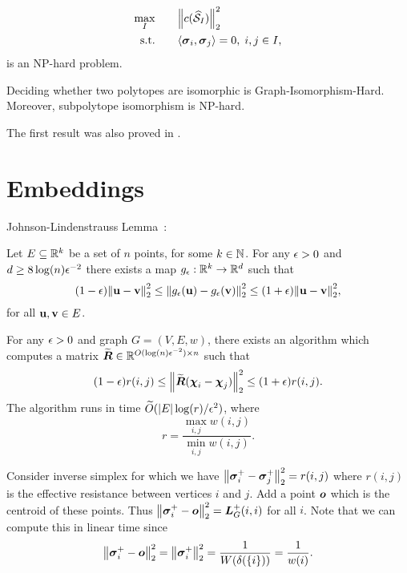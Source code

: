 \begin{alignat*}{2}
\max_I & \quad &&  \norm{c(\widehat{\mathcal{S}}_I)}_2^2 \\
 \text{s.t.}&  &&  \langle \vb*{\sigma}_i,\vb*{\sigma}_j\rangle=0,\; i,j\in I,
\end{alignat*}
is an NP-hard problem.


\begin{theorem}
Deciding whether two polytopes are isomorphic is Graph-Isomorphism-Hard. Moreover, subpolytope isomorphism is NP-hard. 
\end{theorem}

The first result was also proved in \cite{kaibel2008complexity}. 


\section{Embeddings}
Johnson-Lindenstrauss Lemma~\cite{johnson1984extensions,dasgupta2003elementary}: 

\begin{theorem}
Let $E\subseteq \mathbb{R}^k$ be a set of $n$ points, for some $k\in\mathbb{N}$. For any $\epsilon>0$ and $d\geq 8\log(n)\epsilon^{-2}$ there exists a map $g_\epsilon:\mathbb{R}^k\to\mathbb{R}^d$ such that 
\begin{equation*}
    (1-\epsilon)\norm{\vb{u}-\vb{v}}_2^2 \leq \norm{g_\epsilon(\vb{u}) - g_\epsilon(\vb{v})}_2^2 \leq (1+\epsilon)\norm{\vb{u}-\vb{v}}_2^2,
\end{equation*}
for all $\vb{u},\vb{v}\in E$. 
\end{theorem}

\begin{theorem}
For any $\epsilon>0$ and graph $G=(V,E,w)$, there exists an algorithm which computes a matrix $\widetilde{\vb*{R}}\in\mathbb{R}^{O(\log(n)\epsilon^{-2})\times n}$ such that 
\begin{equation*}
    (1-\epsilon)r(i,j) \leq \norm{\widetilde{\vb*{R}}(\boldsymbol{\chi}_i-\boldsymbol{\chi}_j)}_2^2 \leq (1+\epsilon) r(i,j).
\end{equation*}
The algorithm runs in time $\widetilde{O}( |E|\log (r)/\epsilon^2)$, where 
\[r=\frac{\max_{i,j}w(i,j)}{\min_{i,j}w(i,j)}.\]
\end{theorem}

Consider inverse simplex for which we have $\norm{\vb*{\sigma}_i^+-\vb*{\sigma}_j^+}_2^2=r(i,j)$ where $r(i,j)$ is the effective resistance between vertices $i$ and $j$. Add a point $\vb*{o}$ which is the centroid of these points. Thus $\norm{\vb*{\sigma}_i^+-\vb*{o}}_2^2 = \vb*{L}_G^+(i,i)$ for all $i$. Note that we can compute this in linear time since 
\[\norm{\vb*{\sigma}_i^+-\vb*{o}}_2^2 = \norm{\vb*{\sigma}_i^+}_2^2 = \frac{1}{W(\delta(\{i\}))}=\frac{1}{w(i)}.\]

